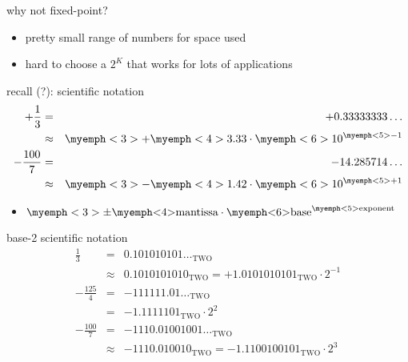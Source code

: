 \begin{frame}{why not fixed-point?}
\begin{itemize}
\item pretty small range of numbers for space used
\item hard to choose a $2^K$ that works for lots of applications
\end{itemize}
\end{frame}

\begin{frame}{recall (?): scientific notation}
\begin{eqnarray*}
+\frac{1}{3} &=& +0.33333333\ldots \\
            &\approx& \myemph<3>{+}\myemph<4>{3.33}\cdot \myemph<6>{10}^{\myemph<5>{-1}} \\
-\frac{100}{7} &=& -14.285714\ldots \\
            &\approx& \myemph<3>{-}\myemph<4>{1.42}\cdot \myemph<6>{10}^{\myemph<5>{+1}} \\
\end{eqnarray*}
\begin{itemize}
\item<2-> $\myemph<3>{\pm}\text{\myemph<4>{mantissa}} \cdot \text{\myemph<6>{base}}^\text{\myemph<5>{exponent}}$
\end{itemize}
\end{frame}

\begin{frame}{base-2 scientific notation}
\begin{eqnarray*}
\frac{1}{3} &=& 0.101010101\ldots_\text{TWO}  \\\
            &\approx& 0.1010101010_\text{TWO} =  +1.0101010101_\text{TWO} \cdot 2^{-1}\\
-\frac{125}{4} &=& -111111.01 \ldots_\text{TWO}  \\\
            &=&-1.1111101_\text{TWO} \cdot 2^2\\
-\frac{100}{7} &=& -1110.01001001\ldots_\text{TWO}  \\\
            &\approx& -1110.010010_\text{TWO} = -1.1100100101_\text{TWO} \cdot 2^3\\
\end{eqnarray*}
\end{frame}


